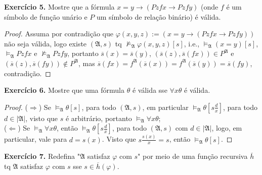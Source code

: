 \documentclass[11pt]{article}
\newcommand{\mf}[1]{\mathfrak{#1}}
\begin{document}
\begin{shaded}
\textbf{Exercício 5.} Mostre que a fórmula $x=y\to(Pzfx\to Pzfy)$ (onde $f$ é um símbolo de função unário e $P$ um símbolo de relação binário) é válida.
\end{shaded}

\begin{proof}
    Assuma por contradição que $\varphi(x,y,z):=(x=y\to(Pzfx\to Pzfy))$ não seja válida, logo existe $(\mf{A},s)$ tq $\nvDash_\mf{A}\varphi(x,y,z)[s]$, i.e., $\vDash_\mf{A}(x=y)[s]$, $\vDash_\mf{A}Pzfx$ e $\nvDash_\mf{A}Pzfy$, portanto $\overline{s}(x)=\overline{s}(y)$, $(\overline{s}(z),\overline{s}(fx))\in P^\mf{A}$ e $(\overline{s}(z),\overline{s}(fy))\notin P^\mf{A}$, mas $\overline{s}(fx)=f^\mf{A}(\overline{s}(x))=f^\mf{A}(\overline{s}(y))=\overline{s}(fy)$, contradição.
\end{proof}

\begin{shaded}
\textbf{Exercício 6.} Mostre que uma fórmula $\theta$ é válida sse $\forall x\theta$ é válida.
\end{shaded}

\begin{proof}
    ($\Rightarrow$) Se $\vDash_\mf{A}\theta[s]$, para todo $(\mf{A},s)$, em particular $\vDash_\mf{A}\theta\left[s\tfrac{d}{x}\right]$, para todo $d\in|\mf{A}|$, visto que $s$ é arbitrário, portanto $\vDash_\mf{A}\forall x\theta$;\\
    ($\Leftarrow$) Se $\vDash_\mf{A}\forall x\theta$, então $\vDash_\mf{A}\theta\left[s\tfrac{d}{x}\right]$, para todo $(\mf{A},s)$ com $d\in|\mf{A}|$, logo, em particular, vale para $d=s(x)$. Visto que $s\tfrac{s(x)}{x}=s$, então $\vDash_\mf{A}\theta[s]$.
\end{proof}

\begin{shaded}
\textbf{Exercício 7.} Redefina "$\mf{A}$ satisfaz $\varphi$ com $s$" por meio de uma função recursiva $\overline{h}$ tq $\mf{A}$ satisfaz $\varphi$ com $s$ sse $s\in\overline{h}(\varphi)$.
\end{shaded}
\end{document}
